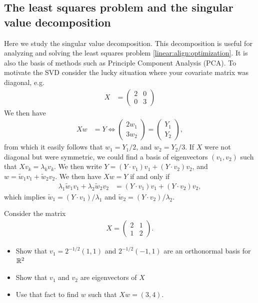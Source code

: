 \subsection{The least squares problem and the singular value decomposition}
Here we study the singular value decomposition.  This decomposition is useful for analyzing and solving the least squares problem \eqref{linear:align:optimization}.  It is also the basis of methods such as Principle Component Analysis (PCA).  To motivate the SVD consider the lucky 
situation where your covariate matrix was diagonal, e.g.
\begin{align*}
  X &= \left( 
  \begin{matrix}
  2 & 0\\
  0 & 3
  \end{matrix}
  \right)
\end{align*}
We then have 
\begin{align*}
  Xw &= Y \Leftrightarrow \left( 
  \begin{matrix}
    2w_1\\3w_2
  \end{matrix}
  \right) = \left( 
  \begin{matrix}
    Y_1 \\ Y_2
  \end{matrix}
  \right),
\end{align*}
from which it easily follows that $w_1 = Y_1/2$, and $w_2 = Y_2/3$.  If $X$ were not diagonal but were symmetric, we could find a basis of eigenvectors $(v_1, v_2)$ such that $Xv_k = \lambda_kv_k$.  We then write $Y = (Y\cdot v_1)v_1 + (Y\cdot v_2)v_2$, and $w = \tilde w_1v_1 + \tilde w_2v_2$.  We then have $Xw=Y$ if and only if
\begin{align*}
  \lambda_1\tilde w_1v_1 + \lambda_2\tilde w_2 v_2 &= (Y\cdot v_1)v_1 + (Y\cdot v_2)v_2,
\end{align*}
which implies $\tilde w_1 = (Y\cdot v_1)/\lambda_1$ and $\tilde w_2 = (Y\cdot v_2)/\lambda_2$.  
\begin{example}
  \label{linear:example:eigendecomp}
  Consider the matrix 
  \begin{align*}
    X = \left( 
    \begin{matrix}
      2 & 1\\
      1 & 2
    \end{matrix}
    \right).
  \end{align*}
  \begin{itemize}
    \item Show that $v_1 = 2^{-1/2}(1,1)$ and $2^{-1/2}(-1,1)$ are an orthonormal basis for ${\mathbb R}^2$
    \item Show that $v_1$ and $v_2$ are eigenvectors of $X$
    \item Use that fact to find $w$ such that $Xw = (3, 4)$.
  \end{itemize}
\end{example}

